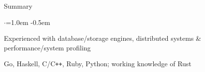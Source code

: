 \documentclass{resume} %
\begin{document}

\begin{rSection}{Summary}
  \vspace {0.5em}
  \begin{list}{$\cdot$}{\leftmargin=1.0em}
    \itemsep -0.5em \vspace{-0.5em}
    \item Experienced with database/storage engines, distributed systems \&
      performance/system profiling
    \item Go, Haskell, C/C\texttt{++}, Ruby, Python; working knowledge of Rust
  \end{list}
  \vspace{0.5em}
\end{rSection}

\end{document}
